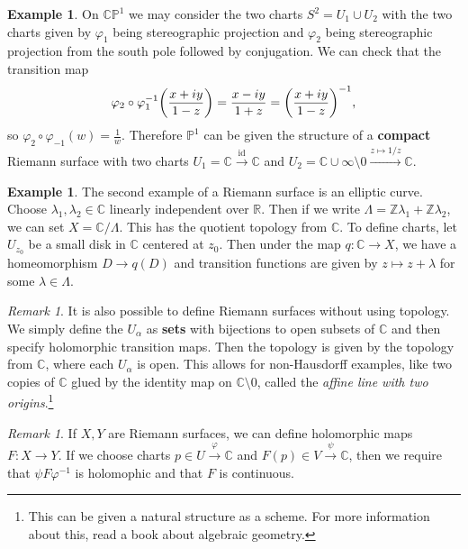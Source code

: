 \documentclass[leqno, openany]{memoir}
\theoremstyle{definition}
\newtheorem{exm}[thm]{Example}
\theoremstyle{remark}
\newtheorem{rmk}[thm]{Remark}
\theoremstyle{plain}
\theoremstyle{definition}
\theoremstyle{remark}
\newcommand{\R}{\mathbb{R}}
\newcommand{\C}{\mathbb{C}}
\newcommand{\Z}{\mathbb{Z}}
\renewcommand{\P}{\mathbb{P}}
\newcommand{\mr}[1]{\mathrm{#1}}
\begin{document}
\begin{exm} On $\C\P^1$ we may consider the two charts $S^2 = U_1 \cup U_2$
    with the two charts given by $\varphi_1$ being stereographic projection and
    $\varphi_2$ being stereographic projection from the south pole followed by
    conjugation. We can check that the transition map \[ \varphi_2 \circ
    \varphi_1^{-1} \qty(\frac{x+iy}{1-z}) = \frac{x-iy}{1+z} =
{\qty(\frac{x+iy}{1-z})}^{-1}, \] so $\varphi_2 \circ \varphi_{-1} (w) =
\frac{1}{w}$. Therefore $\P^1$ can be given the structure of a \textbf{compact}
Riemann surface with two charts $U_1 = \C \xrightarrow{\mr{id}} \C$ and $U_2 =
\C \cup \infty \setminus 0 \xrightarrow{z \mapsto 1/z} \C$.  \end{exm}

\begin{exm} The second example of a Riemann surface is an elliptic curve.
    Choose $\lambda_1, \lambda_2 \in \C$ linearly independent over $\R$. Then
    if we write $\Lambda = \Z \lambda_1 + \Z \lambda_2$, we can set $X =
    \C/\Lambda$. This has the quotient topology from $\C$. To define charts,
    let $U_{z_0}$ be a small disk in $\C$ centered at $z_0$. Then under the map
    $q \colon \C \to X$, we have a homeomorphism $D \to q(D)$ and transition
    functions are given by $z \mapsto z + \lambda$ for some $\lambda \in
    \Lambda$.  \end{exm}

\begin{rmk} It is also possible to define Riemann surfaces without using
    topology. We simply define the $U_{\alpha}$ as \textbf{sets} with
    bijections to open subsets of $\C$ and then specify holomorphic transition
    maps. Then the topology is given by the topology from $\C$, where each
    $U_{\alpha}$ is open. This allows for non-Hausdorff examples, like two
    copies of $\C$ glued by the identity map on $\C \setminus \qty{0}$, called
    the \textit{affine line with two origins}.\footnote{This can be given a
    natural structure as a scheme. For more information about this, read a book
about algebraic geometry.} \end{rmk}

\begin{rmk} If $X, Y$ are Riemann surfaces, we can define holomorphic maps $F
    \colon X \to Y$. If we choose charts $p \in U \xrightarrow{\varphi} \C$ and
    $F(p) \in V \xrightarrow{\psi} \C$, then we require that $\psi F
    \varphi^{-1}$ is holomophic and that $F$ is continuous.  \end{rmk}
\end{document}
